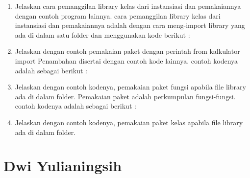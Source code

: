 \begin{enumerate}
    \item Jelaskan cara pemanggilan library kelas dari instansiasi dan pemakaiannya dengan contoh program lainnya.
cara pemanggilan  library kelas dari instansiasi dan pemakaiannya adalah dengan cara meng-import library yang ada di dalam satu folder dan menggunakan kode berikut :
 

    \item Jelaskan dengan contoh pemakaian paket dengan perintah from kalkulator import Penambahan disertai dengan contoh kode lainnya.
contoh kodenya adalah sebagai berikut :
 

    \item Jelaskan dengan contoh kodenya, pemakaian paket fungsi apabila ﬁle library ada di dalam folder.
 Pemakaian paket adalah perkumpulan fungsi-fungsi. contoh kodenya adalah sebagai berikut :
 

    \item Jelaskan dengan contoh kodenya, pemakaian paket kelas apabila ﬁle library ada di dalam folder.
 
 \end{enumerate}


\section{Dwi Yulianingsih}
